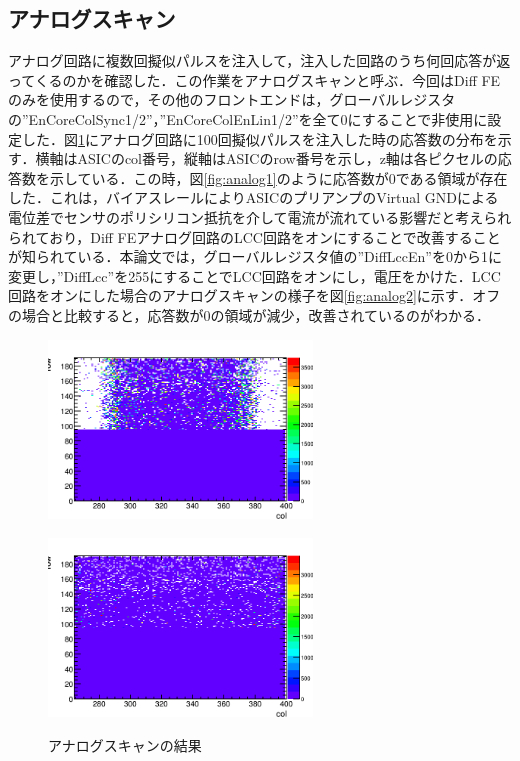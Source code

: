 \subsection{アナログスキャン}
アナログ回路に複数回擬似パルスを注入して，注入した回路のうち何回応答が返ってくるのかを確認した．この作業をアナログスキャンと呼ぶ．今回はDiff FEのみを使用するので，その他のフロントエンドは，グローバルレジスタの''EnCoreColSync1/2''，''EnCoreColEnLin1/2''を全て0にすることで非使用に設定した．図\ref{fig:analog}にアナログ回路に100回擬似パルスを注入した時の応答数の分布を示す．横軸はASICのcol番号，縦軸はASICのrow番号を示し，z軸は各ピクセルの応答数を示している．この時，図\ref{fig:analog1}のように応答数が0である領域が存在した．これは，バイアスレールによりASICのプリアンプのVirtual GNDによる電位差でセンサのポリシリコン抵抗を介して電流が流れている影響だと考えられられており，Diff FEアナログ回路のLCC回路をオンにすることで改善することが知られている．本論文では，グローバルレジスタ値の''DiffLccEn''を0から1に変更し，''DiffLcc''を255にすることでLCC回路をオンにし，電圧をかけた．LCC回路をオンにした場合のアナログスキャンの様子を図\ref{fig:analog2}に示す．オフの場合と比較すると，応答数が0の領域が減少，改善されているのがわかる．

\begin{figure}[h]
  \centering
  \begin{minipage}[b]{0.45\linewidth}
    \centering
    \includegraphics[width=7cm]{./figure/AnalogScan.png}
    \label{fig:analog1}
  \end{minipage}
  \begin{minipage}[b]{0.45\linewidth}
    \centering
    \includegraphics[width=7cm]{./figure/AnalogScan3.png}
    \label{fig:analog2}
  \end{minipage}
  \caption{アナログスキャンの結果}
  \label{fig:analog}
\end{figure}


